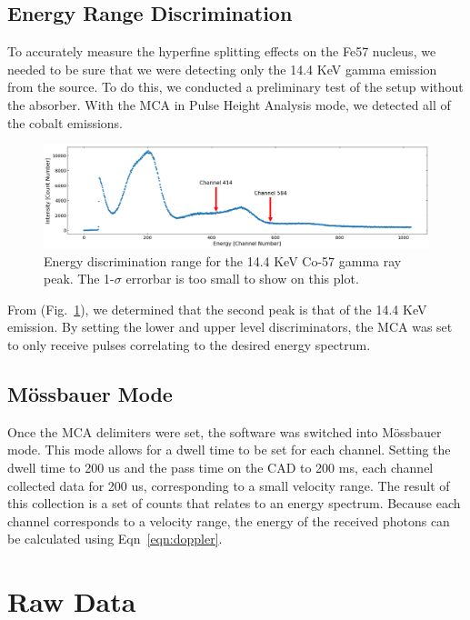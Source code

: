 \documentclass[letterpaper,12pt]{article}
\begin{document}
\subsection{Energy Range Discrimination}

    To accurately measure the hyperfine splitting effects on the Fe57 nucleus, we needed to be sure that we were detecting only the 14.4 KeV gamma emission from the source. To do this, we conducted a preliminary test of the setup without the absorber. With the MCA in Pulse Height Analysis mode, we detected all of the cobalt emissions. 

    \begin{figure}[ht] 
        \centering \includegraphics[width=1\columnwidth]{source_spectra_without_target.png}
        \caption{
                \label{fig:cospect} Energy discrimination range for the 14.4 KeV Co-57 gamma ray peak. The 1-$\sigma$ errorbar is too small to show on this plot.  
        }
\end{figure}    
    
    From (Fig.~\ref{fig:cospect}), we determined that the second peak is that of the 14.4 KeV emission. By setting the lower and upper level discriminators, the MCA was set to only receive pulses correlating to the desired energy spectrum.


\subsection{Mössbauer Mode}

    Once the MCA delimiters were set, the software was switched into Mössbauer mode. This mode allows for a dwell time to be set for each channel. Setting the dwell time to 200 us and the pass time on the CAD to 200 ms, each channel collected data for 200 us, corresponding to a small velocity range. The result of this collection is a set of counts that relates to an energy spectrum. Because each channel corresponds to a velocity range, the energy of the received photons can be calculated using Eqn~\ref{eqn:doppler}. 




\section{Raw Data}
\end{document}
